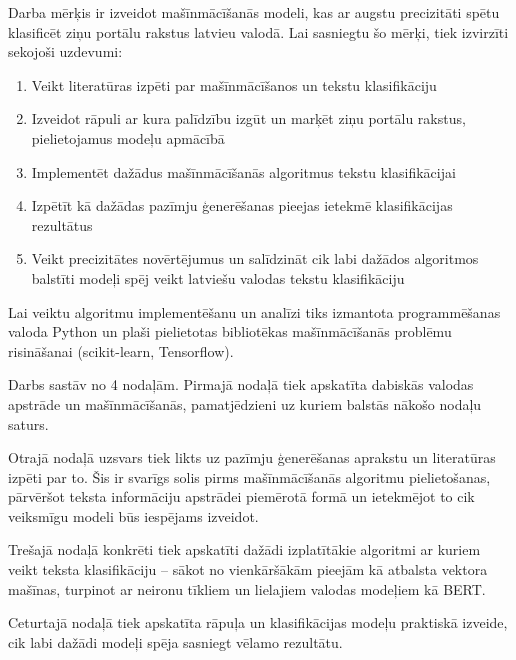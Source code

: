 Darba mērķis ir izveidot mašīnmācīšanās modeli, kas ar augstu precizitāti spētu klasificēt ziņu portālu rakstus latvieu valodā. Lai sasniegtu šo mērķi, tiek izvirzīti sekojoši uzdevumi:
\begin{enumerate}
\item Veikt literatūras izpēti par mašīnmācīšanos un tekstu klasifikāciju
\item Izveidot rāpuli ar kura palīdzību izgūt un marķēt ziņu portālu rakstus, pielietojamus modeļu apmācībā
\item Implementēt dažādus mašīnmācīšanās algoritmus tekstu klasifikācijai
\item Izpētīt kā dažādas pazīmju ģenerēšanas pieejas ietekmē klasifikācijas rezultātus
\item Veikt precizitātes novērtējumus un salīdzināt cik labi dažādos algoritmos balstīti modeļi spēj veikt latviešu valodas tekstu klasifikāciju
\end{enumerate}

Lai veiktu algoritmu implementēšanu un analīzi tiks izmantota programmēšanas valoda Python un plaši pielietotas bibliotēkas mašīnmācīšanās problēmu risināšanai (scikit-learn, Tensorflow).

Darbs sastāv no 4 nodaļām. Pirmajā nodaļā tiek apskatīta dabiskās valodas apstrāde un mašīnmācīšanās, pamatjēdzieni uz kuriem balstās nākošo nodaļu saturs.

Otrajā nodaļā uzsvars tiek likts uz pazīmju ģenerēšanas aprakstu un literatūras izpēti par to. Šis ir svarīgs solis pirms mašīnmācīšanās algoritmu pielietošanas, pārvēršot teksta informāciju apstrādei piemērotā formā un ietekmējot to cik veiksmīgu modeli būs iespējams izveidot.

Trešajā nodaļā konkrēti tiek apskatīti dažādi izplatītākie algoritmi ar kuriem veikt teksta klasifikāciju – sākot no vienkāršākām pieejām kā atbalsta vektora mašīnas, turpinot ar neironu tīkliem un lielajiem valodas modeļiem kā BERT.

Ceturtajā nodaļā tiek apskatīta rāpuļa un klasifikācijas modeļu praktiskā izveide, cik labi dažādi modeļi spēja sasniegt vēlamo rezultātu.
